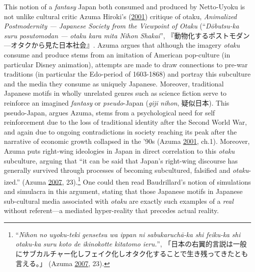 \documentclass[10pt,british,A4paper,,openany]{memoir}
\begin{document}
This notion of a \emph{fantasy} Japan both consumed and produced by
Netto-Uyoku is not unlike cultural critic Azuma Hiroki's
(\protect\hyperlink{ref-azuma_otaku:_2001}{2001}) critique of otaku,
\emph{Animalized Postmodernity --- Japanese Society from the Viewpoint
of Otaku} (``\emph{Dōbutsu-ka suru posutomodan --- otaku kara mita Nihon
Shakai}'', 『動物化するポストモダン---オタクから見た日本社会』. Azuma
argues that although the imagery \emph{otaku} consume and produce stems
from an imitation of American pop-culture (in particular Disney
animation), attempts are made to draw connections to pre-war traditions
(in particular the Edo-period of 1603-1868) and portray this subculture
and the media they consume as uniquely Japanese. Moreover, traditional
Japanese motifs in wholly unrelated genres such as science fiction serve
to reinforce an imagined \emph{fantasy} or \emph{pseudo}-Japan
(\emph{giji nihon}, 疑似日本). This pseudo-Japan, argues Azuma, stems
from a psychological need for self reinforcement due to the loss of
traditional identity after the Second World War, and again due to
ongoing contradictions in society reaching its peak after the narrative
of economic growth collapsed in the '90s (Azuma
\protect\hyperlink{ref-azuma_otaku:_2001}{2001}, ch.1). Moreover, Azuma
puts right-wing ideologies in Japan in direct correlation to this
\emph{otaku} subculture, arguing that ``it can be said that Japan's
right-wing discourse has generally survived through processes of
becoming subcultured, falsified and \emph{otaku}-ized.'' (Azuma
\protect\hyperlink{ref-azuma__2007}{2007}, 23).\footnote{``\emph{Nihon
  no uyoku-teki gensetsu wa ippan ni sabukaruchā-ka shi feiku-ka shi
  otaku-ka suru koto de ikinokotte kitatomo ieru.}'',
  「日本の右翼的言説は一般にサブカルチャー化しフェイク化しオタク化することで生き残ってきたとも言える。」
  (Azuma \protect\hyperlink{ref-azuma__2007}{2007}, 23).} One could then
read Baudrillard's notion of simulations and simulacra in this argument,
stating that those Japanese motifs in Japanese sub-cultural media
associated with \emph{otaku} are exactly such examples of a \emph{real}
without referent---a mediated hyper-reality that precedes actual
reality.
\end{document}
